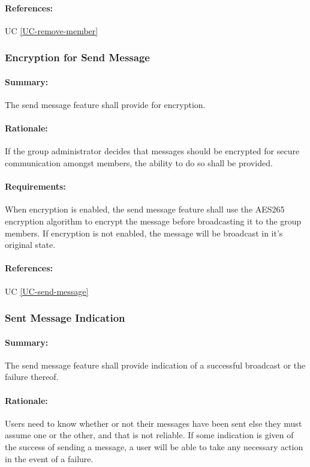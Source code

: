 \documentclass[11pt]{article}
\begin{document}
\paragraph{References:} UC \ref{UC-remove-member}

\subsubsection{Encryption for Send Message} \label{FR-send-message-encrypted}
\paragraph{Summary:} The send message feature shall provide for encryption.
\paragraph{Rationale:} If the group administrator decides that messages should be encrypted for secure communication amongst members, the ability to do so shall be provided.
\paragraph{Requirements:} When encryption is enabled, the send message feature shall use the AES265 encryption algorithm to encrypt the message before broadcasting it to the group members. If encryption is not enabled, the message will be broadcast in it's original state.
\paragraph{References:} UC \ref{UC-send-message}

\subsubsection{Sent Message Indication} \label{FR-send-message-indicator}
\paragraph{Summary:} The send message feature shall provide indication of a successful broadcast or the failure thereof.
\paragraph{Rationale:} Users need to know whether or not their messages have been sent else they must assume one or the other, and that is not reliable. If some indication is given of the success of sending a message, a user will be able to take any necessary action in the event of a failure.
\end{document}

